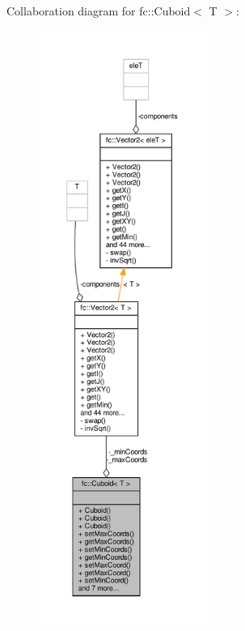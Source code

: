 Collaboration diagram for fc\+:\+:Cuboid$<$ T $>$\+:
\nopagebreak
\begin{figure}[H]
\begin{center}
\leavevmode
\includegraphics[height=550pt]{d0/d67/classfc_1_1Cuboid__coll__graph}
\end{center}
\end{figure}
